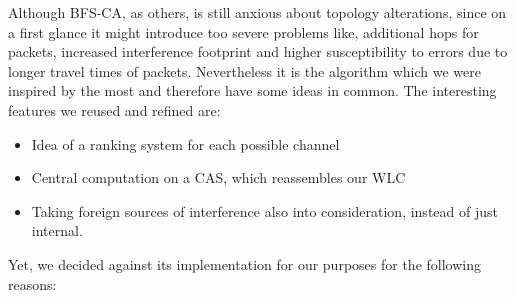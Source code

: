     Although \ac{BFS-CA}, as others, is still anxious about topology alterations, since on a first glance it might introduce too severe problems like, 
    additional hops for packets, increased interference footprint and higher susceptibility to errors due to longer travel times of packets.
    Nevertheless it is the algorithm which we were inspired by the most and therefore have some ideas in common.
    The interesting features we reused and refined are:
    
    \begin{itemize}
     \item Idea of a ranking system for each possible channel
     
     \item Central computation on a \ac{CAS}, which reassembles our \ac{WLC}
     
     \item Taking foreign sources of interference also into consideration, instead of just internal.
     
    \end{itemize}
    
    Yet, we decided against its implementation for our purposes for the following reasons:
    
